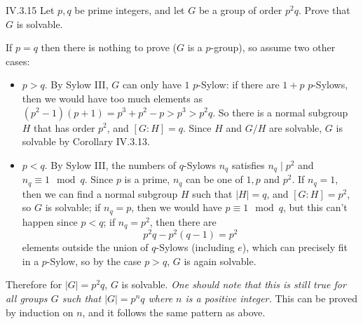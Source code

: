 \begin{problem}{IV.3.15}
Let $p,q$ be prime integers, and let $G$ be a group of order $p^2q$. Prove that $G$ is solvable.
\end{problem}
\begin{pf}
If $p = q$ then there is nothing to prove ($G$ is a $p$-group), so assume two other cases:
\begin{itemize}
\setlength\itemsep{0pt}
\item $p > q$. By Sylow III, $G$ can only have $1$ $p$-Sylow: if there are $1+p$ $p$-Sylows, then we would have too much elements as $(p^2-1)(p+1) = p^3 + p^2 - p > p^3 > p^2q$. So there is a normal subgroup $H$ that has order $p^2$, and $[G:H] = q$. Since $H$ and $G/H$ are solvable, $G$ is solvable by Corollary IV.3.13.
\item $p < q$. By Sylow III, the numbers of $q$-Sylows $n_q$ satisfies $n_q \mid p^2$ and $n_q \equiv 1 \mod q$. Since $p$ is a prime, $n_q$ can be one of $1, p$ and $p^2$. If $n_q = 1$, then we can find a normal subgroup $H$ such that $|H|=q$, and $[G:H]=p^2$, so $G$ is solvable; if $n_q = p$, then we would have $p \equiv 1 \mod q$, but this can't happen since $p < q$; if $n_q = p^2$, then there are 
\[
p^2q - p^2(q-1) = p^2 
\]
elements outside the union of $q$-Sylows (including $e$), which can precisely fit in a $p$-Sylow, so by the case $p>q$, $G$ is again solvable. 
\end{itemize}
Therefore for $|G|=p^2q$, $G$ is solvable. \emph{One should note that this is still true for all groups $G$ such that $|G|=p^nq$ where $n$ is a positive integer.} This can be proved by induction on $n$, and it follows the same pattern as above. 
\end{pf}

